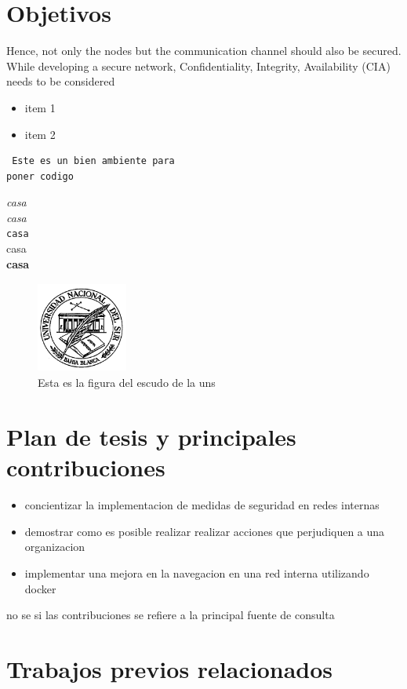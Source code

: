 %



\section{Objetivos}

Hence, not only the nodes but the communication channel should also be secured.
While developing a secure network, Confidentiality, Integrity, Availability (CIA)
needs to be considered

\begin{itemize}
 \item item 1
 \item item 2
\end{itemize}


\begin{verbatim}
 Este es un bien ambiente para 
poner codigo
\end{verbatim}




\textit{casa} \\
\emph{casa} \\
\texttt{casa} \\
\textsf{casa} \\
\textbf{casa} \\

\begin{center}
\begin{figure}

\includegraphics[width=3cm,height=3cm]{uni.bmp}

\caption{Esta es la figura del escudo de la uns}
\end{figure}
\end{center}

\section{Plan de tesis y principales contribuciones}\label{secContribuciones}
\begin{itemize}
    \item concientizar la implementacion de medidas de seguridad en redes internas
    \item demostrar como es posible realizar realizar acciones que perjudiquen a una organizacion
    \item implementar una mejora en la navegacion en una red interna utilizando docker
   \end{itemize}
   no se si las contribuciones se refiere a la principal fuente de consulta
\section{Trabajos previos relacionados}

